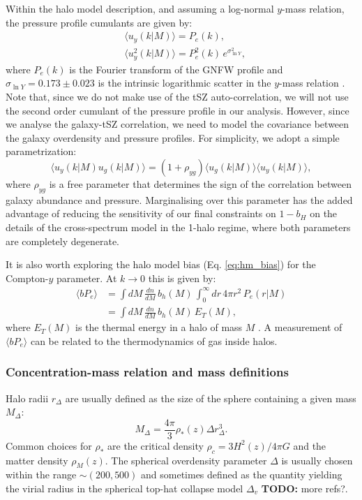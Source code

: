 \documentclass[useAMS,usenatbib]{mn2e}
\newcommand{\todo}[1]{{\bf TODO:} #1}
\begin{document}
      Within the halo model description, and assuming a log-normal $y$-mass relation, the pressure profile cumulants are given by:
      \begin{align}
        &\langle u_y(k|M)\rangle=P_e(k),\\
        &\langle u_y^2(k|M)\rangle=P_e^2(k)\,e^{\sigma_{\ln Y}^2},
      \end{align}
      where $P_e(k)$ is the Fourier transform of the GNFW profile and $\sigma_{\ln Y}=0.173\pm0.023$ is the intrinsic logarithmic scatter in the $y$-mass relation \cite{2016A&A...594A..24P}. Note that, since we do not make use of the tSZ auto-correlation, we will not use the second order cumulant of the pressure profile in our analysis. However, since we analyse the galaxy-tSZ correlation, we need to model the covariance between the galaxy overdensity and pressure profiles. For simplicity, we adopt a simple parametrization:
      \begin{equation}
        \langle u_y(k|M) u_g(k|M)\rangle = (1+\rho_{yg})\langle u_g(k|M)\rangle \langle u_y(k|M)\rangle,
      \end{equation}
      where $\rho_{yg}$ is a free parameter that determines the sign of the correlation between galaxy abundance and pressure. Marginalising over this parameter has the added advantage of reducing the sensitivity of our final constraints on $1-b_H$ on the details of the cross-spectrum model in the 1-halo regime, where both parameters are completely degenerate.

      It is also worth exploring the halo model bias (Eq. \ref{eq:hm_bias}) for the Compton-$y$ parameter. At $k\rightarrow0$ this is given by:
      \begin{align}\nonumber
        \langle bP_e\rangle&=\int dM\,\frac{dn}{dM}\,b_h(M)\,\int_0^\infty dr\,4\pi r^2\,P_e(r|M)\\\label{eq:by}
               &=\int dM\,\frac{dn}{dM}\,b_h(M)\,E_T(M),
      \end{align}
      where $E_T(M)$ is the thermal energy in a halo of mass $M$ \cite{2017MNRAS.467.2315V,2019arXiv190413347P}. A measurement of $\langle bP_e\rangle$ can be related to the thermodynamics of gas inside halos.
      
    \subsubsection{Concentration-mass relation and mass definitions}\label{sssec:theory.hm.cm}
      Halo radii $r_\Delta$ are usually defined as the size of the sphere containing a given mass $M_\Delta$:
      \begin{equation}
        M_\Delta = \frac{4\pi}{3}\rho_*(z)\Delta r^3_\Delta.
      \end{equation}
      Common choices for $\rho_*$ are the critical density $\rho_c=3H^2(z)/4\pi G$ and the matter density $\rho_M(z)$. The spherical overdensity parameter $\Delta$ is usually chosen within the range $\sim(200,500)$ and sometimes defined as the quantity yielding the virial radius in the spherical top-hat collapse model $\Delta_v$ \cite{1998ApJ...495...80B} \todo{more refs?}.
\end{document}
